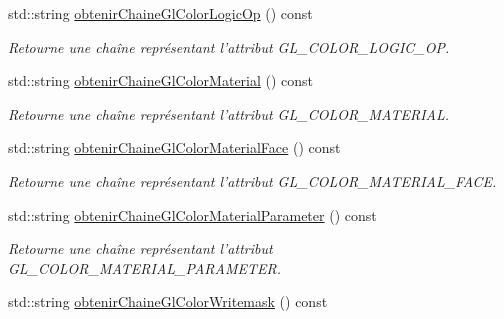 \begin{DoxyCompactItemize}
std\-::string \hyperlink{group__utilitaire_gac48e5f8e10bfcd96670a537164a0a8ff}{obtenir\-Chaine\-Gl\-Color\-Logic\-Op} () const 
\begin{DoxyCompactList}\small\item\em Retourne une chaîne représentant l'attribut G\-L\-\_\-\-C\-O\-L\-O\-R\-\_\-\-L\-O\-G\-I\-C\-\_\-\-O\-P. \end{DoxyCompactList}\item 
std\-::string \hyperlink{group__utilitaire_gae53c823bf9d4e4305baf00f4d7da96af}{obtenir\-Chaine\-Gl\-Color\-Material} () const 
\begin{DoxyCompactList}\small\item\em Retourne une chaîne représentant l'attribut G\-L\-\_\-\-C\-O\-L\-O\-R\-\_\-\-M\-A\-T\-E\-R\-I\-A\-L. \end{DoxyCompactList}\item 
std\-::string \hyperlink{group__utilitaire_gaec66f0ae860a11d50b0e1cf2def483bf}{obtenir\-Chaine\-Gl\-Color\-Material\-Face} () const 
\begin{DoxyCompactList}\small\item\em Retourne une chaîne représentant l'attribut G\-L\-\_\-\-C\-O\-L\-O\-R\-\_\-\-M\-A\-T\-E\-R\-I\-A\-L\-\_\-\-F\-A\-C\-E. \end{DoxyCompactList}\item 
std\-::string \hyperlink{group__utilitaire_gad2b7f4282f94a24c4b5129854732c36a}{obtenir\-Chaine\-Gl\-Color\-Material\-Parameter} () const 
\begin{DoxyCompactList}\small\item\em Retourne une chaîne représentant l'attribut G\-L\-\_\-\-C\-O\-L\-O\-R\-\_\-\-M\-A\-T\-E\-R\-I\-A\-L\-\_\-\-P\-A\-R\-A\-M\-E\-T\-E\-R. \end{DoxyCompactList}\item 
\hypertarget{group__utilitaire_ga677eb5add1db0999f73a7c6febefe4d8}{std\-::string \hyperlink{group__utilitaire_ga677eb5add1db0999f73a7c6febefe4d8}{obtenir\-Chaine\-Gl\-Color\-Writemask} () const }\label{group__utilitaire_ga677eb5add1db0999f73a7c6febefe4d8}


\end{DoxyCompactItemize}

